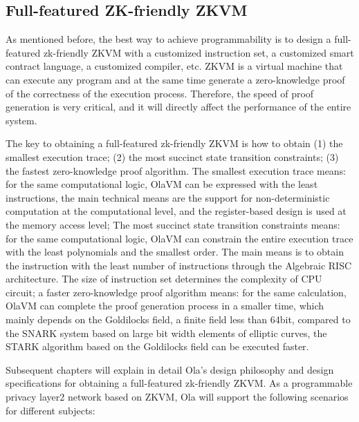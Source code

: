 \subsection{Full-featured ZK-friendly ZKVM}

As mentioned before, the best way to achieve programmability is to design a full-featured zk-friendly ZKVM with a customized instruction set, a customized smart contract language, a customized compiler, etc. 
ZKVM is a virtual machine that can execute any program and at the same time generate a zero-knowledge proof of the correctness of the execution process. Therefore, the speed of proof generation 
is very critical, and it will directly affect the performance of the entire system.

The key to obtaining a full-featured zk-friendly ZKVM is how to obtain (1) the smallest execution trace; (2) the most succinct state transition constraints; (3) the fastest 
zero-knowledge proof algorithm. The smallest execution trace means: for the same computational logic, OlaVM\cite{website:OlaVM} can be expressed with the least instructions, the main technical means are the 
support for non-deterministic computation at the computational level, and the register-based design is used at the memory access level; The most succinct state transition constraints means: 
for the same computational logic, OlaVM\cite{website:OlaVM} can constrain the entire execution trace with the least polynomials and the smallest order. The main means is to obtain the instruction with the least 
number of instructions through the Algebraic RISC architecture. The size of instruction set determines the complexity of CPU circuit; a faster zero-knowledge proof algorithm 
means: for the same calculation, OlaVM\cite{website:OlaVM} can complete the proof generation process in a smaller time, which mainly depends on the Goldilocks\cite{website:Goldilocks} field, a finite field less than 64bit, compared to the 
SNARK system based on large bit width elements of elliptic curves, the STARK algorithm based on the Goldilocks\cite{website:Goldilocks} field can be executed faster.

Subsequent chapters will explain in detail Ola's design philosophy and design specifications for obtaining a full-featured zk-friendly ZKVM. As a programmable privacy layer2 network 
based on ZKVM, Ola will support the following scenarios for different subjects:

